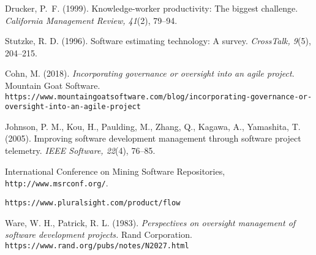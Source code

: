 \documentclass[12pt]{article}
\begin{document}
	\begin{thebibliography}{9}
		Drucker, P.\ F. (1999). Knowledge-worker productivity: The biggest challenge. \textit{California Management Review, 41}(2), 79--94.

		Stutzke, R. D. (1996). Software estimating technology: A survey. \textit{CrossTalk, 9}(5), 204--215.
		
		Cohn, M. (2018). \textit{Incorporating governance or oversight into an agile project}. Mountain Goat Software.\\
\texttt{https://www.mountaingoatsoftware.com/blog/incorporating-govern\-ance-or-oversight-into-an-agile-project}
		
		Johnson, P. M., Kou, H., Paulding, M., Zhang, Q., Kagawa, A., Yamashita, T. (2005). Improving software development management through software project telemetry. \textit{IEEE Software, 22}(4), 76--85.
		
		International Conference on Mining Software Repositories,\\ \texttt{http://www.msrconf.org/}.
		
		\texttt{https://www.pluralsight.com/product/flow}
		
		Ware, W. H., Patrick, R. L. (1983). \textit{Perspectives on oversight management of software development projects.} Rand Corporation.\\\texttt{https://www.rand.org/pubs/notes/N2027.html}
	\end{thebibliography}
	
\end{document}
